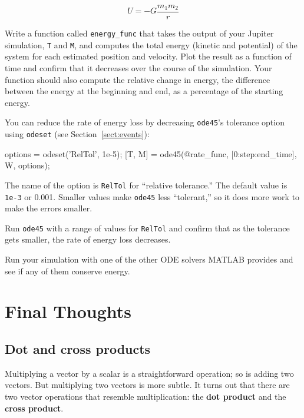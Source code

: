 \documentclass[
]{book}
\numberwithin{Answer}{chapter}
\numberwithin{Exercise}{chapter}
\begin{document}
\begin{equation}
U = -G \frac{m_1 m_2}{r}
\end{equation}

\begin{ex}
Write a function called {\tt energy\_func} that takes the output of
your Jupiter simulation, {\tt T} and {\tt M}, and computes the total
energy (kinetic and potential) of the system for each estimated
position and velocity.  Plot the result as a function of time and
confirm that it decreases over the course of the simulation.  Your
function should also compute the relative change in energy, the
difference between the energy at the beginning and end, as a
percentage of the starting energy.
\end{ex}

You can reduce the rate of energy loss by decreasing {\tt ode45}'s
tolerance option using {\tt odeset} (see Section~\ref{sect:events}):

\begin{code}
options = odeset('RelTol', 1e-5);
[T, M] = ode45(@rate_func, [0:step:end_time], W, options);
\end{code}
%
The name of the option is {\tt RelTol} for ``relative tolerance.''
The default value is {\tt 1e-3} or 0.001.  Smaller values
make {\tt ode45} less ``tolerant,'' so it does more work to
make the errors smaller.

\begin{ex}
Run {\tt ode45} with a range of values for {\tt RelTol} and confirm
that as the tolerance gets smaller, the rate of energy loss
decreases.
\end{ex}

\begin{ex}
Run your simulation with one of the other ODE solvers MATLAB provides
and see if any of them conserve energy.
\end{ex}



\chapter{Final Thoughts}

\section{Dot and cross products}

Multiplying a vector by a scalar is a straightforward operation;
so is adding two vectors.  But multiplying two vectors is more
subtle.  It turns out that there are two vector operations that
resemble multiplication: the {\bf dot product}
and the {\bf cross product}.
\end{document}
